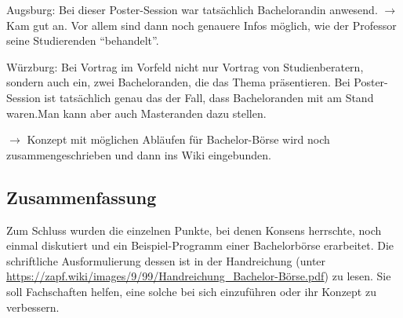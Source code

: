     Augsburg: Bei dieser Poster-Session war tatsächlich Bachelorandin anwesend. $\rightarrow$ Kam gut an. Vor allem sind dann noch genauere Infos möglich, wie der Professor seine Studierenden ``behandelt''.

    Würzburg: Bei Vortrag im Vorfeld nicht nur Vortrag von Studienberatern, sondern auch ein, zwei Bacheloranden, die das Thema präsentieren. Bei Poster-Session ist tatsächlich genau das der Fall, dass Bacheloranden mit am Stand waren.Man kann aber auch Masteranden dazu stellen.

    $\rightarrow$ Konzept mit möglichen Abläufen für Bachelor-Börse wird noch zusammengeschrieben und dann ins Wiki eingebunden.

    \subsection*{Zusammenfassung}
      Zum Schluss wurden die einzelnen Punkte, bei denen Konsens herrschte, noch einmal diskutiert und ein Beispiel-Programm einer Bachelorbörse erarbeitet. Die schriftliche Ausformulierung dessen ist in der Handreichung (unter \url{https://zapf.wiki/images/9/99/Handreichung_Bachelor-Börse.pdf}) zu lesen. Sie soll Fachschaften helfen, eine solche bei sich einzuführen oder ihr Konzept zu verbessern.
